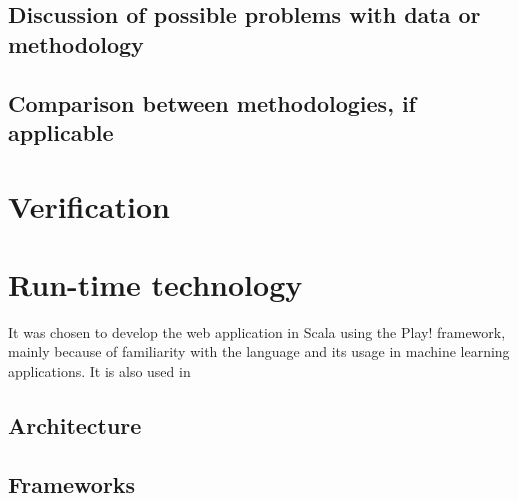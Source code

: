 \documentclass[journal,10pt]{IEEEtran}
\begin{document}
\subsection{Discussion of possible problems with data or methodology}
\subsection{Comparison between methodologies, if applicable}

\section{Verification}





\section{Run-time technology}

It was chosen to develop the web application in Scala using the Play! framework, mainly because of familiarity with the language and its usage in machine learning applications. It is also used in  

\subsection{Architecture}\label{sec:architecture}


\subsection{Frameworks}\label{sec:frameworks}

\end{document}
